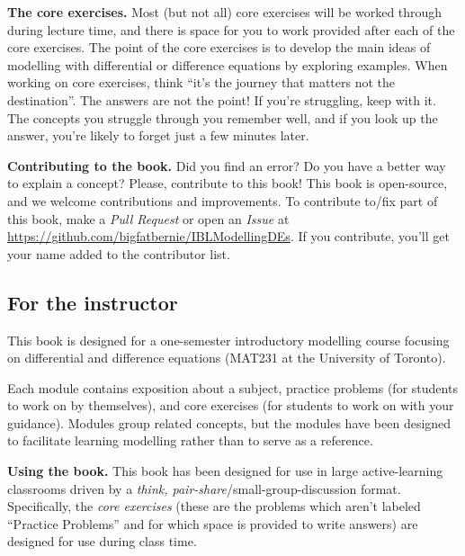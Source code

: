 {\bf The core exercises.} Most (but not all) core exercises will be
worked through during lecture time, and there is space for you to work
provided after each of the core exercises. 
The point of the core exercises is to develop the main ideas of modelling with differential or difference equations by exploring examples. When working on core exercises, think ``it's the journey that matters not the destination''. The answers are not the point! If you're struggling, keep with it. The concepts you struggle through you remember well, and if you look up the answer, you're likely to forget just a few minutes later. 


{\bf Contributing to the book.} Did you find an error? Do you
have a better way to explain a concept? Please,
contribute to this book!  This book is open-source, and we welcome
contributions and improvements. To contribute to/fix part of
this book, make a \emph{Pull Request} or open an \emph{Issue} at
\url{https://github.com/bigfatbernie/IBLModellingDEs}. If you contribute,
you'll get your name added to the contributor list.


\subsection*{For the instructor}

This book is designed for a one-semester introductory modelling course focusing on differential and difference equations (MAT231 at the University of Toronto). 


Each module contains exposition about a subject, practice problems (for students to work on by themselves), and core exercises (for students to work on with your guidance). Modules group related concepts, but the modules have been designed to facilitate learning modelling rather than to serve as a reference. 

{\bf Using the book.} This book has been designed for use in large 
active-learning classrooms driven by a \emph{think, pair-share}/small-group-discussion format.
Specifically, the \emph{core exercises} (these are the problems which aren't labeled ``Practice Problems'' and for which space is provided to write answers) are designed for use during class time.


